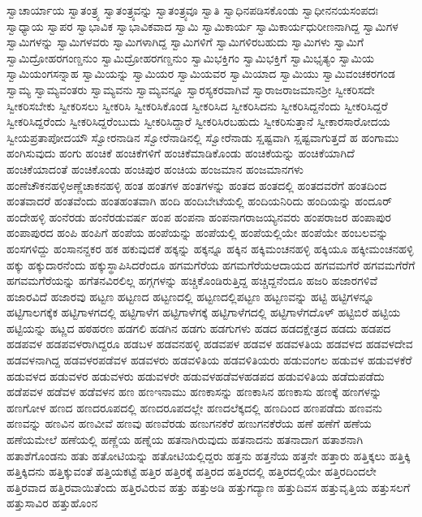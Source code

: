 {ಸ್ವಾಚಾರ್ಯಾಯ
ಸ್ವಾತಂತ್ರ್ಯ
ಸ್ವಾತಂತ್ರ್ಯವನ್ನು
ಸ್ವಾತಂತ್ರ್ಯವೂ
ಸ್ವಾತಿ
ಸ್ವಾಧಿನಪಡಿಸಕೊಂಡು
ಸ್ವಾಧೀನನಯಸಂಪದಃ
ಸ್ವಾಧ್ಯಾಯ
ಸ್ವಾಪರ
ಸ್ವಾಭಾವಿಕ
ಸ್ವಾಭಾವಿಕವಾದ
ಸ್ವಾಮಿ
ಸ್ವಾಮಿಕಾರ್ಯ
ಸ್ವಾಮಿಕಾರ್ಯಧುರೀಣನಾಗಿದ್ದ
ಸ್ವಾಮಿಗಳ
ಸ್ವಾಮಿಗಳನ್ನು
ಸ್ವಾಮಿಗಳವರು
ಸ್ವಾಮಿಗಳಾಗಿದ್ದ
ಸ್ವಾಮಿಗಳಿಗೆ
ಸ್ವಾಮಿಗಳಿರಬಹುದು
ಸ್ವಾಮಿಗಳು
ಸ್ವಾಮಿಗೆ
ಸ್ವಾಮಿದ್ರೋಹರಗಂಣ್ಡನುಂ
ಸ್ವಾಮಿದ್ರೋಹರಗಣ್ಡನುಂ
ಸ್ವಾಮಿಭಕ್ತಿಗಂ
ಸ್ವಾಮಿಭಕ್ತಿಗೆ
ಸ್ವಾಮಿಭೃತ್ಯಂ
ಸ್ವಾಮಿಯ
ಸ್ವಾಮಿಯಂಗಸನ್ನಾಹ
ಸ್ವಾಮಿಯನ್ನು
ಸ್ವಾಮಿಯರ
ಸ್ವಾಮಿಯವರ
ಸ್ವಾಮಿಯಾದ
ಸ್ವಾಮಿಯು
ಸ್ವಾಮಿವಂಚಕರಗಂಡ
ಸ್ವಾಮ್ಯ
ಸ್ವಾಮ್ಯವಂತರು
ಸ್ವಾಮ್ಯವನು
ಸ್ವಾಮ್ಯವನ್ನೂ
ಸ್ವಾರಸ್ಯಕರವಾಗಿವೆ
ಸ್ವಾರಾಜರಾಜಮಾನಶ್ರೀ
ಸ್ವೀಕರಿಸದೇ
ಸ್ವೀಕರಿಸಬೇಕು
ಸ್ವೀಕರಿಸಲು
ಸ್ವೀಕರಿಸಿ
ಸ್ವೀಕರಿಸಿಕೊಂಡ
ಸ್ವೀಕರಿಸಿದ
ಸ್ವೀಕರಿಸಿದನು
ಸ್ವೀಕರಿಸಿದ್ದನೆಂದು
ಸ್ವೀಕರಿಸಿದ್ದರೆ
ಸ್ವೀಕರಿಸಿದ್ದರೆಂದು
ಸ್ವೀಕರಿಸಿದ್ದರೆಂಬುದು
ಸ್ವೀಕರಿಸಿದ್ದಾರೆ
ಸ್ವೀಕರಿಸಿರಬಹುದು
ಸ್ವೀಕರಿಸುತ್ತಾನೆ
ಸ್ವೀಕಾರಸಾರೋದಯ
ಸ್ವೀಯಪ್ರತಾಪೋದಯೌ
ಸ್ವೋರನಾಡಿನ
ಸ್ವೋರೆನಾಡಿನಲ್ಲಿ
ಸ್ವೋರೆನಾಡು
ಸ್ಷಷ್ಟವಾಗಿ
ಸ್ಷಷ್ಟವಾಗುತ್ತದೆ
ಹ
ಹಂಗಾಮು
ಹಂಗಿಸುವುದು
ಹಂಗು
ಹಂಚಿಕೆ
ಹಂಚಿಕೆಗಳಿಗೆ
ಹಂಚಿಕೆಮಾಡಿಕೊಂಡು
ಹಂಚಿಕೆಯನ್ನು
ಹಂಚಿಕೆಯಾಗಿದೆ
ಹಂಚಿಕೆಯಾದಂತೆ
ಹಂಚಿಕೊಂಡು
ಹಂಚಿಪುರ
ಹಂಚಿಯ
ಹಂಜಮಾನ
ಹಂಜಮಾನಗಳು
ಹಂಣೆಚೌಕನಹಳ್ಳಿಅಣ್ಣೆಚಾಕನಹಳ್ಳಿ
ಹಂತ
ಹಂತಗಳ
ಹಂತಗಳನ್ನು
ಹಂತದ
ಹಂತದಲ್ಲಿ
ಹಂತದವರೆಗೆ
ಹಂತದಿಂದ
ಹಂತವಾದರೆ
ಹಂತವೆಂದು
ಹಂತಹಂತವಾಗಿ
ಹಂದಿ
ಹಂದಿಬೇಟೆಯಲ್ಲಿ
ಹಂದಿಯನಿರಿದು
ಹಂದಿಯನ್ನು
ಹಂದೂರ್
ಹಂದೇಹಳ್ಳಿ
ಹಂನೆರಡು
ಹಂನೆರಡುವರ್ಷ
ಹಂಪ
ಹಂಪನಾ
ಹಂಪನಾಗರಾಜಯ್ಯನವರು
ಹಂಪರಾಜರ
ಹಂಪಾಪುರ
ಹಂಪಾಪುರದ
ಹಂಪಿ
ಹಂಪಿಗೆ
ಹಂಪೆಯ
ಹಂಪೆಯನ್ನು
ಹಂಪೆಯಲ್ಲಿ
ಹಂಪೆಯಲ್ಲಿಯೇ
ಹಂಪೆಯೇ
ಹಂಬಲವನ್ನು
ಹಂಸಗಳಿದ್ದು
ಹಂಸಾನನ್ದಕರ
ಹಕ
ಹಕುವುದಕೆ
ಹಕ್ಕನ್ನು
ಹಕ್ಕನ್ನೂ
ಹಕ್ಕಿನ
ಹಕ್ಕಿಮಂಚನಹಳ್ಳಿ
ಹಕ್ಕಿಯೂ
ಹಕ್ಕೀಮಂಚನಹಳ್ಳಿ
ಹಕ್ಕು
ಹಕ್ಕುದಾರನೆಂದು
ಹಕ್ಕುಸ್ಥಾಪಿಸಿದರೆಂದೂ
ಹಗಮಗೆರೆಯ
ಹಗಮಗೆರೆಯಆದಾಯದ
ಹಗವಮಗೆರೆ
ಹಗವಮಗೆರೆಗೆ
ಹಗವಮಗೆರೆಯನ್ನು
ಹಗೆತನವಿರಲಿಲ್ಲ
ಹಗ್ಗಗಳನ್ನು
ಹಚ್ಚಿಕೊಂಡಿರುತ್ತಿದ್ದ
ಹಚ್ಚಿದ್ದನೆಂದೂ
ಹಜರಿ
ಹಜಾರಗಳಿವೆ
ಹಜಾರವಿದೆ
ಹಜಾರವು
ಹಟ್ಟಣ
ಹಟ್ಟಣದ
ಹಟ್ಟಣದಲ್ಲಿ
ಹಟ್ಟಣದಲ್ಲಿಪಟ್ಟಣ
ಹಟ್ಟಣವನ್ನು
ಹಟ್ಟಿ
ಹಟ್ಟಿಗಳನ್ನೂ
ಹಟ್ಟಿಗಾಲಗಕ್ಕೆಕ
ಹಟ್ಟಿಗಾಳಗದಲ್ಲಿ
ಹಟ್ಟಿಗಾಳೆಗ
ಹಟ್ಟಿಗಾಳೆಗಕ್ಕೆ
ಹಟ್ಟಿಗಾಳೆಗದಲ್ಲಿ
ಹಟ್ಟಿಗಾಳೆಗದೊಳ್
ಹಟ್ಟಿಬಿರೆ
ಹಟ್ಟಿಯ
ಹಟ್ಟಿಯನ್ನು
ಹಟ್ಣದ
ಹಠಹರಣ
ಹಡಗಲಿ
ಹಡಗಿನ
ಹಡಗು
ಹಡಗುಗಳು
ಹಡದ
ಹಡದಕ್ಷೇತ್ರದ
ಹಡದು
ಹಡಪದ
ಹಡಪವಳ
ಹಡಪವಳರಾಗಿದ್ದರೂ
ಹಡಬಳ
ಹಡವನಹಳ್ಳಿ
ಹಡವಪಳ
ಹಡವಳ
ಹಡವಳತಿಯ
ಹಡವಳದ
ಹಡವಳದೇವ
ಹಡವಳನಾಗಿದ್ದ
ಹಡವಳರಪಡೆವಳ
ಹಡವಳರು
ಹಡವಳಿತಿಯ
ಹಡವಳಿತಿಯರು
ಹಡುವಂಗಲ
ಹಡುವಳ
ಹಡುವಳಕೆರೆ
ಹಡುವಳದ
ಹಡುವಳರ
ಹಡುವಳರು
ಹಡುವಳರೇ
ಹಡುವಳಹಡೆವಳಹಡಪದ
ಹಡುವಳಿತಿಯ
ಹಡೆದುಪಡೆದು
ಹಡೆಪವಳ
ಹಡೆವಳ
ಹಡೆವಳನ
ಹಣ
ಹಣಇನಾಮು
ಹಣಕಾಸನ್ನು
ಹಣಕಾಸಿನ
ಹಣಕಾಸು
ಹಣಕ್ಕೆ
ಹಣಗಳನ್ನು
ಹಣಗೋಳ
ಹಣದ
ಹಣದರೂಪದಲ್ಲಿ
ಹಣದರೂಪದಲ್ಲೇ
ಹಣದಲೆಕ್ಕದಲ್ಲಿ
ಹಣದಿಂದ
ಹಣಪಡೆದು
ಹಣವನು
ಹಣವನ್ನು
ಹಣವಿನ
ಹಣವೀವೆ
ಹಣವು
ಹಣವೆರಡು
ಹಣುಗನಕೆರೆ
ಹಣುಗನಕೆರೆಯ
ಹಣೆ
ಹಣೆಗೆ
ಹಣೆಯ
ಹಣೆಯಮೇಲೆ
ಹಣೆಯಲ್ಲಿ
ಹಣ್ಣೆಯ
ಹಣ್ನೆಯ
ಹತನಾಗಿರುವುದು
ಹತನಾದನು
ಹತನಾದಾಗ
ಹತಾಶನಾಗಿ
ಹತಾಶೆಗೊಂಡನು
ಹತು
ಹತೋಟಿಯನ್ನು
ಹತೋಟಿಯಲ್ಲಿದ್ದರು
ಹತ್ತನು
ಹತ್ತನೆಯ
ಹತ್ತನೇ
ಹತ್ತಾರು
ಹತ್ತಿಕ್ಕಲು
ಹತ್ತಿಕ್ಕಿ
ಹತ್ತಿಕ್ಕಿದನು
ಹತ್ತಿಕ್ಕುವಂತೆ
ಹತ್ತಿಯಕಟ್ಟೆ
ಹತ್ತಿರ
ಹತ್ತಿರಕ್ಕೆ
ಹತ್ತಿರದ
ಹತ್ತಿರದಲ್ಲಿ
ಹತ್ತಿರದಲ್ಲಿಯೇ
ಹತ್ತಿರದಿಂದಲೇ
ಹತ್ತಿರವಾದ
ಹತ್ತಿರವಾಯಿತೆಂದು
ಹತ್ತಿರವಿರುವ
ಹತ್ತು
ಹತ್ತುಅಡಿ
ಹತ್ತುಗದ್ಯಾಣ
ಹತ್ತುದಿವಸ
ಹತ್ತುವೃತ್ತಿಯ
ಹತ್ತುಸಲಗೆ
ಹತ್ತುಸಾವಿರ
ಹತ್ತುಹೊಂನ
}
